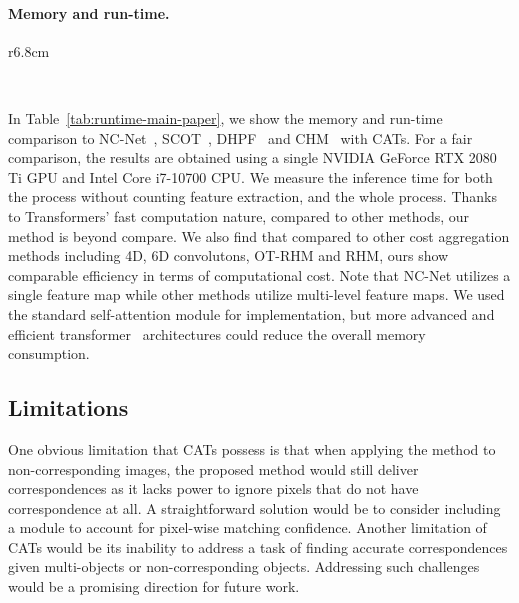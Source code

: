 \paragraph{Memory and run-time.}
\begin{wraptable}{r}{6.8cm}
\vspace{-7mm}
\caption{\textbf{Memory and run-time comparison.} Inference time for aggregator is denoted by .}
\label{tab:runtime-main-paper}\vspace{+5pt}
\centering
{} \\
\centering
\end{wraptable}
In Table~\ref{tab:runtime-main-paper}, we show the memory and run-time comparison to NC-Net~\cite{rocco2018neighbourhood}, SCOT~\cite{liu2020semantic}, DHPF~\cite{min2020learning} and CHM~\cite{min2021convolutional} with CATs. For a fair comparison, the results are obtained using a single NVIDIA GeForce RTX 2080 Ti GPU and Intel Core i7-10700 CPU. We measure the inference time for both the process without counting feature extraction, and the whole process. Thanks to Transformers' fast computation nature, compared to other methods, our method is beyond compare. We also find that compared to other cost aggregation methods including 4D, 6D convolutons, OT-RHM and RHM, ours show comparable efficiency in terms of computational cost. Note that NC-Net utilizes a single feature map while other methods utilize multi-level feature maps. We used the standard self-attention module for implementation, but more advanced and efficient transformer~\cite{liu2021swin} architectures could reduce the overall memory consumption.

\subsection{Limitations}
One obvious limitation that CATs possess is that when applying the method to non-corresponding images, the proposed method would still deliver correspondences as it lacks power to ignore pixels that do not have correspondence at all. A straightforward solution would be to consider including a module to account for pixel-wise matching confidence. Another limitation of CATs would be its inability to address a task of finding accurate correspondences given multi-objects or non-corresponding objects. Addressing such challenges would be a promising direction for future work.